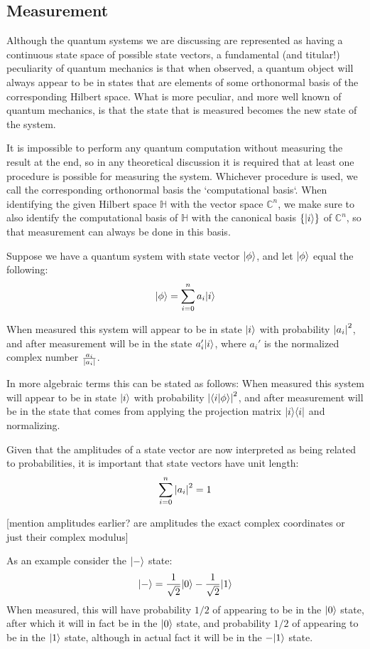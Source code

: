 \subsection{Measurement}
Although the quantum systems we are discussing are represented as having a continuous state space of possible state vectors, a fundamental (and titular!) peculiarity of quantum mechanics is that when observed, a quantum object will always appear to be in states that are elements of some orthonormal basis of the corresponding Hilbert space. What is more peculiar, and more well known of quantum mechanics, is that the state that is measured becomes the new state of the system.

It is impossible to perform any quantum computation without measuring the result at the end, so in any theoretical discussion it is required that at least one procedure is possible for measuring the system. Whichever procedure is used, we call the corresponding orthonormal basis the `computational basis`. When identifying the given Hilbert space $\mathbb{H}$ with the vector space $\mathbb{C}^n$, we make sure to also identify the computational basis of $\mathbb{H}$ with the canonical basis $\{| i \rangle\}$ of $\mathbb{C}^n$, so that measurement can always be done in this basis.

Suppose we have a quantum system with state vector $| \phi \rangle$, and let $| \phi \rangle$ equal the following:
\[| \phi \rangle = \sum_{i=0}^n a_i| i \rangle\]

When measured this system will appear to be in state $| i \rangle$ with probability $\left| a_i \right|^2$, and after measurement will be in the state $a_i'| i \rangle$, where $a_i'$ is the normalized complex number $\frac{a_i}{\left| a_i \right|}$.

In more algebraic terms this can be stated as follows:
When measured this system will appear to be in state $| i \rangle$ with probability $\left| \langle i | \phi \rangle \right|^2$, and after measurement will be in the state that comes from applying the projection matrix $| i \rangle\langle i |$ and normalizing.

Given that the amplitudes of a state vector are now interpreted as being related to probabilities, it is important that state vectors have unit length:
\[\sum_{i=0}^n \left| a_i \right|^2 = 1\]

[mention amplitudes earlier? are amplitudes the exact complex coordinates or just their complex modulus]

As an example consider the $| - \rangle$ state:
\[| - \rangle=\frac{1}{\sqrt{2}}| 0 \rangle - \frac{1}{\sqrt{2}}| 1 \rangle\]
When measured, this will have probability $1/2$ of appearing to be in the $| 0 \rangle$ state, after which it will in fact be in the $| 0 \rangle$ state, and probability $1/2$ of appearing to be in the $| 1 \rangle$ state, although in actual fact it will be in the $-| 1 \rangle$ state.
